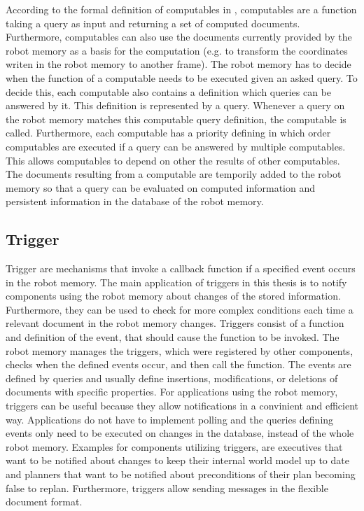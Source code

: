 {According to the formal definition of computables in
, computables are a function taking a query as
input and returning a set of computed documents. Furthermore,
computables can also use the documents currently provided by the robot
memory as a basis for the computation (e.g. to transform the
coordinates writen in the robot memory to another frame). The robot
memory has to decide when the function of a computable needs to be
executed given an asked query. To decide this, each computable also
contains a definition which queries can be answered by
it. This definition is represented by a query. Whenever a query on the
robot memory matches this computable query definition, the computable
is called. Furthermore, each computable has a priority defining in which
order computables are executed if a query can be answered by multiple
computables. This allows computables to depend on other the results of
other computables. The documents resulting from a computable are
temporily added to the robot memory so that a query can be evaluated
on computed information and persistent information in the database of
the robot memory.

\subsection{Trigger}
\label{sec:trigger}
Trigger are mechanisms that invoke a callback function if a specified
event occurs in the robot memory. The main application of triggers in
this thesis is to notify components using the robot memory about
changes of the stored information. Furthermore, they can be used to
check for more complex conditions each time a relevant document in the
robot memory changes. Triggers consist of a function and definition of
the event, that should cause the function to be invoked. The robot
memory manages the triggers, which were registered by other
components, checks when the defined events occur, and then call the
function. The events are defined by queries and usually define
insertions, modifications, or deletions of documents with specific
properties. For applications using the robot memory, triggers can be
useful because they allow notifications in a convinient and efficient
way. Applications do not have to implement polling and the queries
defining events only need to be executed on changes in the database,
instead of the whole robot memory. Examples for components utilizing
triggers, are executives that want to be notified about changes to
keep their internal world model up to date and planners that want to
be notified about preconditions of their plan becoming false to
replan. Furthermore, triggers allow sending messages in the flexible
document format.

}
